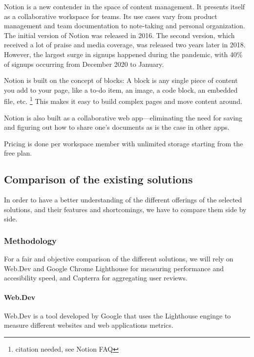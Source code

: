
Notion is a new contender in the space of content management. It
presents itself as a collaborative workspace for teams. Its use cases
vary from product management and team documentation to note-taking and
personal organization. The initial version of Notion was released in
2016. The second version, which received a lot of praise and media
coverage, was released two years later in 2018. However, the largest
surge in signups happened during the pandemic, with 40\% of signups
occurring from December 2020 to January.

Notion is built on the concept of blocks: A block is any single piece
of content you add to your page, like a to-do item, an image, a code
block, an embedded file, etc. \footnote{citation needed, see Notion FAQ}
This makes it easy to build complex pages and move content around.

Notion is also built as a collaborative web app---eliminating the need
for saving and figuring out how to share one's documents as is the case
in other apps.

Pricing is done per workspace member with unlimited storage starting
from the free plan.

\subsection{Comparison of the existing solutions}

In order to have a better understanding of the different offerings of the selected solutions, and their features and shortcomings, we have to compare them side by side.

\subsubsection{Methodology}

For a fair and objective comparison of the different solutions, we will rely on Web.Dev and Google Chrome Lighthouse for measuring performance and accesibility speed, and Capterra for aggregating user reviews.

\paragraph{Web.Dev}

Web.Dev is a tool developed by Google that uses the Lighthouse enginge to measure different websites and web applications metrics.

